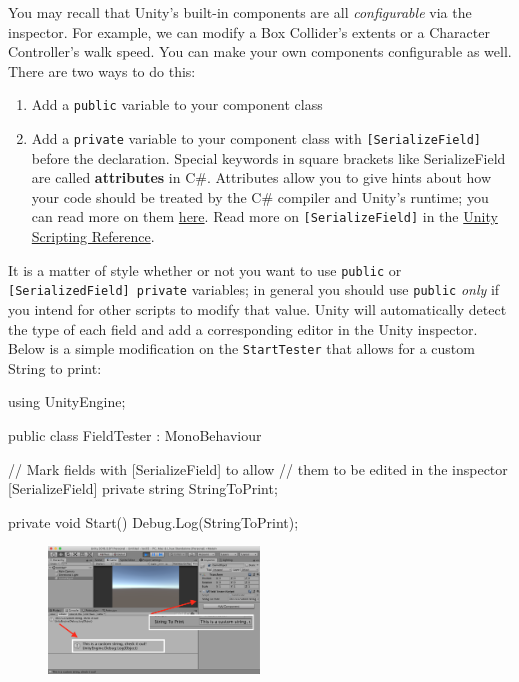 \documentclass[11pt]{article}
\def\StartLineAt#1{\lstset{firstnumber=#1}}
\begin{document}
You may recall that Unity's built-in components are all \textit{configurable} via the inspector.
For example, we can modify a Box Collider's extents or a Character Controller's walk speed.  You can
make your own components configurable as well.  There are two ways to do this:
\begin{enumerate}
    \item Add a \lstinline|public| variable to your component class
    \item Add a \lstinline|private| variable to your component class with \lstinline|[SerializeField]|
          before the declaration.  Special keywords in square brackets like SerializeField are called
          \textbf{attributes} in C\#.  Attributes allow you to give hints about how your code should
          be treated by the C\# compiler and Unity's runtime; you can read more on them 
          \href{https://docs.microsoft.com/en-us/dotnet/csharp/programming-guide/concepts/attributes/}{here}.
          Read more on \lstinline|[SerializeField]| in the 
          \href{https://docs.unity3d.com/ScriptReference/SerializeField.html}{Unity Scripting Reference}.
\end{enumerate}
It is a matter of style whether or not you want to use \lstinline|public| or \lstinline|[SerializedField] private|
variables; in general you should use \lstinline|public| \textit{only} if you intend for other scripts
to modify that value.  Unity will automatically detect the type of each field and add a corresponding
editor in the Unity inspector.  Below is a simple modification on the \lstinline|StartTester| that
allows for a custom String to print:

\StartLineAt{1}
\begin{csharp}
using UnityEngine;

public class FieldTester : MonoBehaviour
{
    // Mark fields with [SerializeField] to allow 
    // them to be edited in the inspector
    [SerializeField]
    private string StringToPrint;

    private void Start()
    {
        Debug.Log(StringToPrint);
    }
}
\end{csharp}

\begin{figure}
    \vspace*{-2em}
    \includegraphics[width=0.5\textwidth]{fields}
\end{figure}
\end{document}

